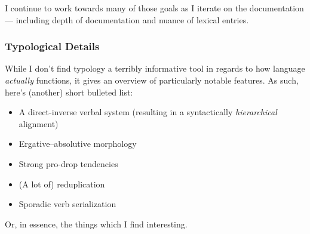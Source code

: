 I continue to work towards many of those goals as I iterate on the documentation --- including depth of documentation and nuance of lexical entries.

\subsubsection{Typological Details}
While I don't find typology a terribly informative tool in regards to how language \textit{actually} functions, it gives an overview of particularly notable features. As such, here's (another) short bulleted list:

\begin{itemize}
  \item A direct-inverse verbal system (resulting in a syntactically \textit{hierarchical} alignment)
  \item Ergative--absolutive morphology
  \item Strong pro-drop tendencies
  \item (A lot of) reduplication
  \item Sporadic verb serialization
\end{itemize}

Or, in essence, the things which I find interesting.
